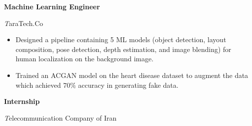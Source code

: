 \begin{rubric}{}
\entry*[2020 -- 2021]%
	\textbf{Machine Learning Engineer} \par {\emph TaraTech.Co}

        \begin{itemize}
          \setlength{\itemsep}{0ex} %
          \setlength{\parskip}{1pt}     %
            \item  Designed a pipeline containing 5 ML models (object detection, layout composition, pose detection, depth estimation, and image blending) for human localization on the background image.
            \item Trained an ACGAN model on the heart disease dataset to augment the data which achieved 70\% accuracy in generating fake data.
        \end{itemize}
        
\entry*[2019 -- 2020]%
	\textbf{Internship} \par {\emph Telecommunication Company of Iran} 


\end{rubric}